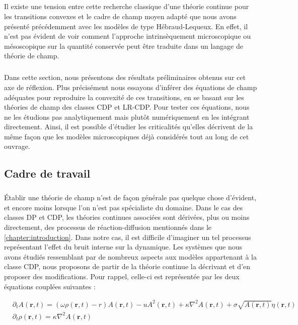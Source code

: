 \subparagraph{}Il existe une tension entre cette recherche classique d'une théorie continue pour les transitions convexes et le cadre de champ moyen adapté que nous avons présenté précédemment avec les modèles de type Hébraud-Lequeux. En effet, il n'est pas évident de voir comment l'approche intrinsèquement microscopique ou mésoscopique sur la quantité conservée peut être traduite dans un langage de théorie de champ.

\subparagraph{}Dans cette section, nous présentons des résultats préliminaires obtenus sur cet axe de réflexion. Plus précisément nous essayons d'inférer des équations de champ adéquates pour reproduire la convexité de ces transitions, en se basant sur les théories de champ des classes CDP et LR-CDP. Pour tester ces équations, nous ne les étudions pas analytiquement mais plutôt numériquement en les intégrant directement. Ainsi, il est possible d'étudier les criticalités qu'elles décrivent de la même façon que les modèles microscopiques déjà considérés tout au long de cet ouvrage.

\subsection{Cadre de travail}

\subparagraph{}Établir une théorie de champ n'est de façon générale pas quelque chose d'évident, et encore moins lorsque l'on n'est pas spécialiste du domaine. Dans le cas des classes DP et CDP, les théories continues associées sont dérivées, plus ou moins directement, des processus de réaction-diffusion mentionnés dans le \autoref{chapter:introduction}. Dans notre cas, il est difficile d'imaginer un tel processus représentant l'effet du bruit interne sur la dynamique. Les systèmes que nous avons étudiés ressemblant par de nombreux aspects aux modèles appartenant à la classe CDP, nous proposons de partir de la théorie continue la décrivant et d'en proposer des modifications. Pour rappel, celle-ci est représentée par les deux équations couplées suivantes :

\begin{equation}
\begin{aligned}
	&\partial_t A(\mathbf{r}, t) = (\omega\rho (\mathbf{r}, t) - r)A(\mathbf{r}, t) - uA^2(\mathbf{r}, t) + \kappa\nabla^2 A (\mathbf{r}, t) + \sigma \sqrt{A(\mathbf{r}, t)} \eta(\mathbf{r}, t)\\
	&\partial_t \rho (\mathbf{r}, t) = \kappa\nabla^2 A (\mathbf{r}, t)
\end{aligned}
\label{eq:CDP2}
\end{equation}

